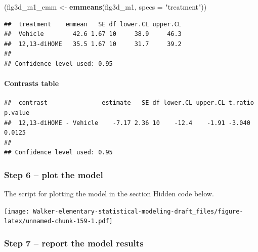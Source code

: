 \documentclass[]{book}
\newenvironment{Shaded}{\begin{snugshade}}{\end{snugshade}}
\newcommand{\DataTypeTok}[1]{\textcolor[rgb]{0.13,0.29,0.53}{#1}}
\newcommand{\KeywordTok}[1]{\textcolor[rgb]{0.13,0.29,0.53}{\textbf{#1}}}
\newcommand{\NormalTok}[1]{#1}
\newcommand{\OperatorTok}[1]{\textcolor[rgb]{0.81,0.36,0.00}{\textbf{#1}}}
\newcommand{\OtherTok}[1]{\textcolor[rgb]{0.56,0.35,0.01}{#1}}
\newcommand{\StringTok}[1]{\textcolor[rgb]{0.31,0.60,0.02}{#1}}
\let\oldparagraph\paragraph
\renewcommand{\paragraph}[1]{\oldparagraph{#1}\mbox{}}
\begin{document}
\begin{Shaded}
\begin{Highlighting}[]
\NormalTok{(fig3d_m1_emm <-}\StringTok{ }\KeywordTok{emmeans}\NormalTok{(fig3d_m1, }\DataTypeTok{specs =} \StringTok{"treatment"}\NormalTok{))}
\end{Highlighting}
\end{Shaded}

\begin{verbatim}
##  treatment    emmean   SE df lower.CL upper.CL
##  Vehicle        42.6 1.67 10     38.9     46.3
##  12,13-diHOME   35.5 1.67 10     31.7     39.2
## 
## Confidence level used: 0.95
\end{verbatim}

\hypertarget{contrasts-table}{%
\paragraph{Contrasts table}\label{contrasts-table}}

\begin{Shaded}
\end{Shaded}

\begin{verbatim}
##  contrast               estimate   SE df lower.CL upper.CL t.ratio p.value
##  12,13-diHOME - Vehicle    -7.17 2.36 10    -12.4    -1.91 -3.040  0.0125 
## 
## Confidence level used: 0.95
\end{verbatim}

\hypertarget{step-6-plot-the-model}{%
\subsubsection{Step 6 -- plot the model}\label{step-6-plot-the-model}}

The script for plotting the model in the section Hidden code below.

\texttt{[image: Walker-elementary-statistical-modeling-draft\_files/figure-latex/unnamed-chunk-159-1.pdf]}

\hypertarget{step-7-report-the-model-results}{%
\subsubsection{Step 7 -- report the model results}\label{step-7-report-the-model-results}}
\end{document}

